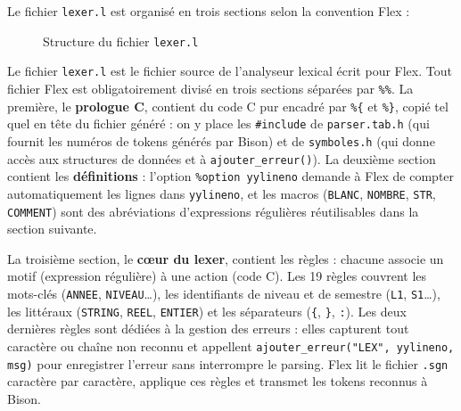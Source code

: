 \documentclass[10pt,a4paper]{article}
\begin{document}
Le fichier \texttt{lexer.l} est organisé en trois sections selon la convention Flex :

\begin{figure}[h]
\centering
{}
\caption{Structure du fichier \texttt{lexer.l}}
\end{figure}

Le fichier \texttt{lexer.l} est le fichier source de l'analyseur lexical écrit pour Flex.
Tout fichier Flex est obligatoirement divisé en trois sections séparées par \texttt{\%\%}.
La première, le \textbf{prologue C}, contient du code C pur encadré par \texttt{\%\{} et
\texttt{\%\}}, copié tel quel en tête du fichier généré : on y place les \texttt{\#include}
de \texttt{parser.tab.h} (qui fournit les numéros de tokens générés par Bison) et de
\texttt{symboles.h} (qui donne accès aux structures de données et à
\texttt{ajouter\_erreur()}). La deuxième section contient les \textbf{définitions} :
l'option \texttt{\%option yylineno} demande à Flex de compter automatiquement les lignes
dans \texttt{yylineno}, et les macros (\texttt{BLANC}, \texttt{NOMBRE}, \texttt{STR},
\texttt{COMMENT}) sont des abréviations d'expressions régulières réutilisables dans la
section suivante.

La troisième section, le \textbf{cœur du lexer}, contient les règles : chacune associe
un motif (expression régulière) à une action (code C). Les 19 règles couvrent les
mots-clés (\texttt{ANNEE}, \texttt{NIVEAU}\ldots), les identifiants de niveau et de
semestre (\texttt{L1}, \texttt{S1}\ldots), les littéraux (\texttt{STRING}, \texttt{REEL},
\texttt{ENTIER}) et les séparateurs (\texttt{\{}, \texttt{\}}, \texttt{:}). Les deux
dernières règles sont dédiées à la gestion des erreurs : elles capturent tout caractère
ou chaîne non reconnu et appellent \texttt{ajouter\_erreur("LEX", yylineno, msg)} pour
enregistrer l'erreur sans interrompre le parsing. Flex lit le fichier \texttt{.sgn}
caractère par caractère, applique ces règles et transmet les tokens reconnus à Bison.
\end{document}
